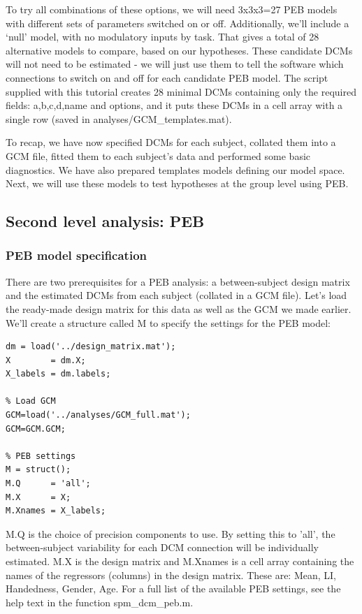 \documentclass{article}
\begin{document}
To try all combinations of these options, we will need 3x3x3=27 PEB  models with different sets of parameters switched on or off. Additionally, we'll include a `null' model, with no modulatory inputs by task. That gives a total of 28 alternative models to compare, based on our hypotheses. These candidate DCMs will not need to be estimated - we will just use them to tell the software which connections to switch on and off for each candidate PEB model. The script supplied with this tutorial creates 28 minimal DCMs containing only the required fields: a,b,c,d,name and options, and it puts these DCMs in a cell array with a single row (saved in analyses/GCM\_templates.mat).

To recap, we have now specified DCMs for each subject, collated them into a GCM file, fitted them to each subject's data and performed some basic diagnostics. We have also prepared templates models defining our model space. Next, we will use these models to test hypotheses at the group level using PEB.

\subsection{Second level analysis: PEB}

\subsubsection{PEB model specification}
There are two prerequisites for a PEB analysis: a between-subject design matrix and the estimated DCMs from each subject (collated in a GCM file). Let's load the ready-made design matrix for this data as well as the GCM we made earlier. We'll create a structure called M to specify the settings for the PEB model:

\begin{lstlisting}[style=Matlab-editor,caption=PEB specification]
% Load design matrix
dm = load('../design_matrix.mat');
X        = dm.X;
X_labels = dm.labels;

% Load GCM
GCM=load('../analyses/GCM_full.mat');
GCM=GCM.GCM;

% PEB settings
M = struct();
M.Q      = 'all';
M.X      = X;
M.Xnames = X_labels;
\end{lstlisting}

M.Q is the choice of precision components to use. By setting this to 'all', the between-subject variability for each DCM connection will be individually estimated. M.X is the design matrix and M.Xnames is a cell array containing the names of the regressors (columns) in the design matrix. These are: Mean, LI, Handedness, Gender, Age. For a full list of the available PEB settings, see the help text in the function spm\_dcm\_peb.m. 
\end{document}
